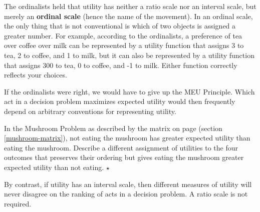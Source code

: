 The ordinalists held that utility has neither a ratio scale nor an
interval scale, but merely an \textbf{ordinal scale} (hence the name
of the movement). In an ordinal scale, the only thing that is not
conventional is which of two objects is assigned a greater number. For
example, according to the ordinalists, a preference of tea over coffee
over milk can be represented by a utility function that assigns 3 to
tea, 2 to coffee, and 1 to milk, but it can also be represented by a
utility function that assigns 300 to tea, 0 to coffee, and -1 to
milk. Either function correctly reflects your choices.

If the ordinalists were right, we would have to give up the MEU
Principle. Which act in a decision problem maximizes expected utility
would then frequently depend on arbitrary conventions for representing
utility.

\begin{exercise}
  In the Mushroom Problem as described by the matrix on page
  \pageref{mushroom-matrix} (section \ref{mushroom-matrix}), not
  eating the mushroom has greater expected utility than eating the
  mushroom. Describe a different assignment of utilities to the four
  outcomes that preserves their ordering but gives eating the mushroom
  greater expected utility than not eating. $\star$
\end{exercise}

By contrast, if utility has an interval scale, then different measures
of utility will never disagree on the ranking of acts in a decision
problem. A ratio scale is not required. 



